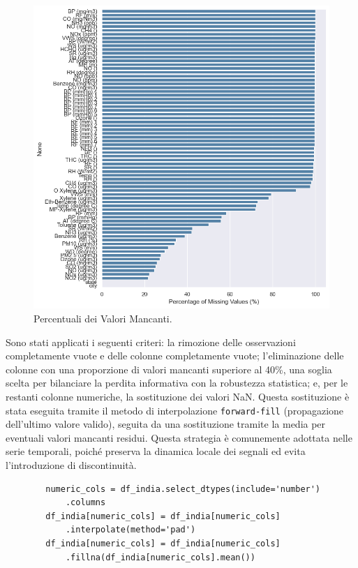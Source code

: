 \documentclass[a4paper,12pt]{report}
\begin{document}
	\begin{figure}[H]
		\centering
		\includegraphics[width=1.0\textwidth]{img/miss_value_pm.png}
		\caption{Percentuali dei Valori Mancanti.}
	\end{figure}
	
	Sono stati applicati i seguenti criteri: la rimozione delle osservazioni completamente vuote e delle colonne completamente vuote; l'eliminazione delle colonne con una proporzione di valori mancanti superiore al 40\%, una soglia scelta per bilanciare la perdita informativa con la robustezza statistica; e, per le restanti colonne numeriche, la sostituzione dei valori NaN. Questa sostituzione è stata eseguita tramite il metodo di interpolazione \texttt{forward-fill} (propagazione dell'ultimo valore valido), seguita da una sostituzione tramite la media per eventuali valori mancanti residui. Questa strategia è comunemente adottata nelle serie temporali, poiché preserva la dinamica locale dei segnali ed evita l'introduzione di discontinuità.
	
	\begin{verbatim}
		numeric_cols = df_india.select_dtypes(include='number')
			.columns
		df_india[numeric_cols] = df_india[numeric_cols]
			.interpolate(method='pad')
		df_india[numeric_cols] = df_india[numeric_cols]
			.fillna(df_india[numeric_cols].mean())
	\end{verbatim}
	
\end{document}
